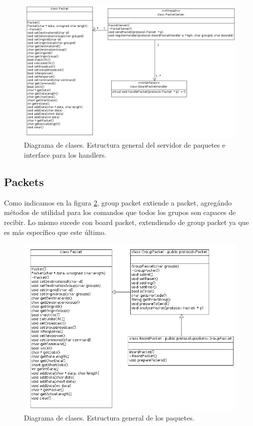 \begin{figure}[ht]
	\centering
	\includegraphics[scale=0.483]{comportamientos/figures/cs4.png}
	\caption[Diagrama de clases: Servidor de paquetes e interface]
			{Diagrama de clases. Estructura general del servidor de paquetes
			e interface para los handlers.}
	\label{fig:diag_server_handler_packet}
\end{figure}
\subsection{Packets}
Como indicamos en la figura \ref{fig:packet_group_board}, group packet extiende
a packet, agreg\'ando m\'etodos de utilidad para los comandos que todos
los grupos son capaces de recibir. Lo mismo sucede con board packet,
extendiendo de group packet ya que es m\'as espec\'ifico que este \'ultimo.

\begin{figure}[ht]
	\centering
	\includegraphics[scale=0.5]{comportamientos/figures/cs1.png}
	\caption[[Diagrama de clases: Estructura general]{Diagrama de clases. Estructura general de los paquetes.}
	\label{fig:packet_group_board}
\end{figure}

